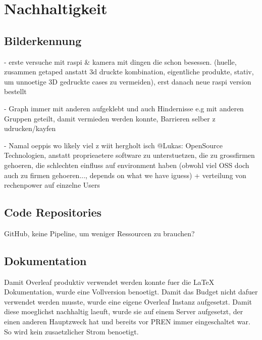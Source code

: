 \section{Nachhaltigkeit}







\subsection{Bilderkennung}

- erste versuche mit raspi \& kamera mit dingen die schon besessen. (huelle, zusammen getaped anstatt 3d druckte kombination, eigentliche produkte, stativ, um unnoetige 3D gedruckte cases zu vermeiden), erst danach neue raspi version bestellt

- Graph immer mit anderen aufgeklebt und auch Hindernisse e.g mit anderen Gruppen geteilt, damit vermieden werden konnte, Barrieren selber z udrucken/kayfen

- Namal oeppis wo likely viel z wiit hergholt isch @Lukas: OpenSource Technologien, anstatt proprieaetere software zu unterstuetzen, die zu grossfirmen gehoeren, die schlechten einfluss auf environment haben (obwohl viel OSS doch auch zu firmen gehoeren..., depends on what we have iguess)  + verteilung von rechenpower auf einzelne Users 

\subsection{Code Repositories}

GitHub\cite{github-sustainability}, keine Pipeline, um weniger Ressourcen zu brauchen?



\subsection{Dokumentation}

Damit Overleaf produktiv verwendet werden konnte fuer die LaTeX Dokumentation, wurde eine Vollversion benoetigt. Damit das Budget nicht dafuer verwendet werden musste, wurde eine eigene Overleaf Instanz aufgesetzt. Damit diese moeglichst nachhaltig laeuft, wurde sie auf einem Server aufgesetzt, der einen anderen Hauptzweck hat und bereits vor PREN immer eingeschaltet war. So wird kein zusaetzlicher Strom benoetigt.

